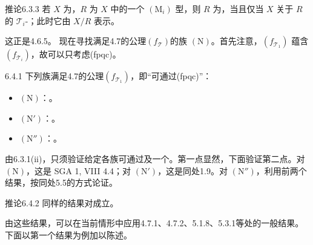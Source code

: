 \begin{SGAresult}{推论}{6.3.3}
若 $X$ 为，$R$ 为 $X$ 中的一个 $(\mathrm M_i)$ 型，则 $R$ 为，当且仅当 $X$ 关于 $R$ 的 $\mathcal T_i$-；此时它由 $X/R$ 表示。
\end{SGAresult}
这正是4.6.5。
现在寻找满足4.7的公理$(f_{\mathcal T})$的族 $(\mathrm N)$。首先注意，$(f_{\mathcal T_1})$ 蕴含$(f_{\mathcal T_i})$，故可以只考虑(fpqc)。
\begin{SGAresult}{}{6.4.1}
下列族满足4.7的公理$(f_{\mathcal T_1})$，即“可通过(fpqc)”：
\begin{itemize}
\item $(\mathrm N)$：。
\item $(\mathrm N')$：。
\item $(\mathrm N'')$：。
\end{itemize}
\end{SGAresult}
由6.3.1(ii)，只须验证给定各族可通过及一个。第一点显然，下面验证第二点。对 $(\mathrm N)$，这是 SGA 1, VIII 4.4；对 $(\mathrm N')$，这是同处1.9。对 $(\mathrm N'')$，利用前两个结果，按同处5.5的方式论证。
\begin{SGAresult}{推论}{6.4.2}
同样的结果对成立。
\end{SGAresult}
由这些结果，可以在当前情形中应用4.7.1、4.7.2、5.1.8、5.3.1等处的一般结果。下面以第一个结果为例加以陈述。
